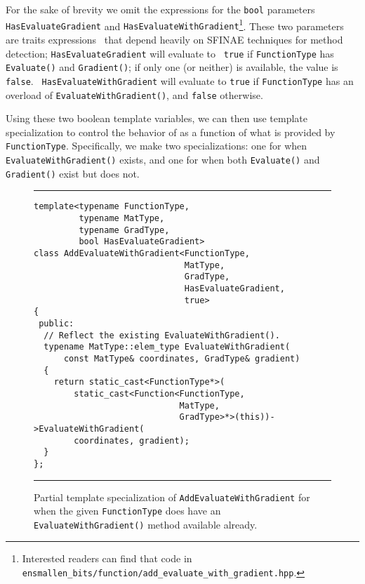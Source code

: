 For the sake of brevity we omit the expressions for the {\tt bool} parameters
{\tt HasEvaluateGradient} and {\tt HasEvaluateWithGradient}\footnote{Interested
readers can find that code in {\tt
ensmallen\_bits/function/add\_evaluate\_with\_gradient.hpp}.}.  These two
parameters are traits expressions~\cite{TODO} that depend heavily on SFINAE
techniques for method detection; {\tt HasEvaluateGradient} will evaluate to {\tt
true} if {\tt FunctionType} has {\tt Evaluate()} and {\tt Gradient()}; if only
one (or neither) is available, the value is {\tt false}.  {\tt
HasEvaluateWithGradient} will evaluate to {\tt true} if {\tt FunctionType} has
an overload of {\tt EvaluateWithGradient()}, and {\tt false} otherwise.

Using these two boolean template variables, we can then use template
specialization to control the behavior of  as a function of what is provided by {\tt
FunctionType}.  Specifically, we make two specializations: one for when {\tt
EvaluateWithGradient()} exists, and one for when both {\tt Evaluate()} and {\tt
Gradient()} exist but  does not.

\begin{figure}[t!]
\hrule
\vspace{1ex}
\begin{verbatim}
template<typename FunctionType,
         typename MatType,
         typename GradType,
         bool HasEvaluateGradient>
class AddEvaluateWithGradient<FunctionType,
                              MatType,
                              GradType,
                              HasEvaluateGradient,
                              true>
{
 public:
  // Reflect the existing EvaluateWithGradient().
  typename MatType::elem_type EvaluateWithGradient(
      const MatType& coordinates, GradType& gradient)
  {
    return static_cast<FunctionType*>(
        static_cast<Function<FunctionType,
                             MatType,
                             GradType>*>(this))->EvaluateWithGradient(
        coordinates, gradient);
  }
};
\end{verbatim}
\hrule
\vspace*{-0.5em}
\caption{Partial template specialization of {\tt AddEvaluateWithGradient} for
when the given {\tt FunctionType} does have an {\tt EvaluateWithGradient()}
method available already.}
\label{fig:aewg-s1}
\end{figure}

